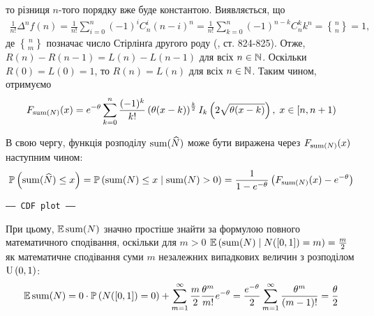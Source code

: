 то різниця $n$-того порядку вже буде константою. Виявляється,
що
\begin{gather*}
    \frac{1}{n!} \Delta^n f(n) = 
    \frac{1}{n!} \sum_{i=0}^n (-1)^i C_n^i (n - i)^n = 
    \frac{1}{n!} \sum_{k=0}^n (-1)^{n-k} C_n^k k^n = {n\brace n} = 1,
\end{gather*}
де ${n \brace m}$ позначає число Стірлінґа другого роду (\cite{Abramowitz_Stegun}, ст. 824-825).
Отже, $R(n) - R(n-1) = L(n) - L(n-1)$ для всіх $n \in \mathbb{N}$. Оскільки
$R(0) = L(0) = 1$, то $R(n) = L(n)$ для всіх $n \in \mathbb{N}$.
Таким чином, отримуємо 
\begin{gather}
    F_{\operatorname{sum}(N)}(x) = e^{-\theta}
    \sum_{k=0}^{n} \frac{(-1)^k}{k!}
    \left(\theta (x - k)\right)^{\frac{k}{2}} I_k\left(2\sqrt{\theta(x-k)}\right), \; x \in [n, n+1)
\end{gather}

В свою чергу, функція розподілу $\operatorname{sum}(\widehat{N})$ 
може бути виражена через $F_{\operatorname{sum}(N)}(x)$ наступним чином:
\begin{equation}
    \mathbb{P}\left(\operatorname{sum}(\widehat{N}) \leq x\right) = \mathbb{P}\left(\operatorname{sum}(N) \leq x \mid \operatorname{sum}(N) > 0\right) = \frac{1}{1-e^{-\theta}} \left(F_{\operatorname{sum}(N)}(x) - e^{-\theta}\right)
\end{equation}
\begin{center}
    \texttt{----- CDF plot -----}
\end{center}

При цьому, $\mathbb{E}\operatorname{sum}(N)$ значно простіше знайти
за формулою повного математичного сподівання,
оскільки для $m > 0$ $\mathbb{E}\left(\operatorname{sum}(N) \mid N([0, 1]) = m\right) = \frac{m}{2}$
як математичне сподівання суми $m$ незалежних випадкових величин
з розподілом $\mathrm{U}\left(0, 1\right)$:
\begin{gather*}
    \mathbb{E}\operatorname{sum}(N) = 0\cdot \mathbb{P}\left(N([0, 1]) = 0\right) +
    \sum_{m=1}^{\infty} \frac{m}{2} \frac{\theta^m}{m!} e^{-\theta} =
    \frac{e^{-\theta}}{2}\sum_{m=1}^{\infty} \frac{\theta^m}{(m-1)!} = \frac{\theta}{2}
\end{gather*}

